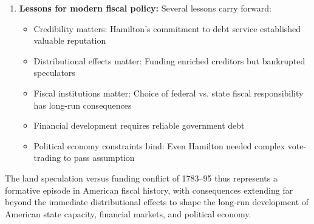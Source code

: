 \documentclass[12pt]{article}
\begin{document}
\begin{enumerate}
\item \textbf{Lessons for modern fiscal policy:} Several lessons carry forward:
\begin{itemize}
\item Credibility matters: Hamilton's commitment to debt service established valuable reputation
\item Distributional effects matter: Funding enriched creditors but bankrupted speculators
\item Fiscal institutions matter: Choice of federal vs. state fiscal responsibility has long-run consequences
\item Financial development requires reliable government debt
\item Political economy constraints bind: Even Hamilton needed complex vote-trading to pass assumption
\end{itemize}
\end{enumerate}

The land speculation versus funding conflict of 1783--95 thus represents a formative episode in American fiscal history, with consequences extending far beyond the immediate distributional effects to shape the long-run development of American state capacity, financial markets, and political economy.



\end{document}
